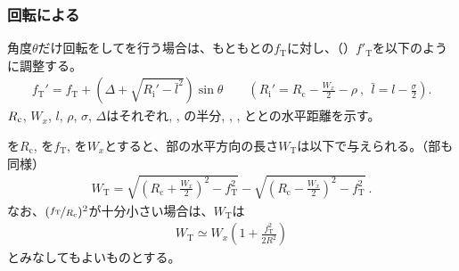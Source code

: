 \subsubsection{\indexTableAlocationAdjustment\nameTable 回転による\nameAlocationAdjustment}
角度$\theta$だけ\TableAlocationAdjustment\nameTable 回転をして\nameAlocationAdjustment を行う場合は、もともとの\TopAlocationLength$f_\mathrm T$に対し、\nameTopAlocationLength（\TopReAlocationLength）$f'_\mathrm T$を以下のように調整する。
\begin{align*}
  f_\mathrm T'
  = f_\mathrm T+\left(\Delta+\sqrt{R_\mathrm i'-\bar l^2}\right)\sin\theta\qquad
    \left(R_\mathrm i' = R_\mathrm c-\frac{W_x}2-\rho~,~~\bar l = l-\frac\sigma2\right).
\end{align*}
$R_\textrm c$, $W_x$, $l$, $\rho$, $\sigma$, $\Delta$はそれぞれ\CenterCurvatureRadius, \ACOD, \JigWidth の半分, \ReceiverPlateRadius, \ReceiverPlateWidth, \ReceiverPlateCenter と\TableCenter との水平距離を示す。



\clearpage
\nameCenterCurvatureRadius を$R_\mathrm c$, \TopAlocationLength を$f_\mathrm T$, \ACOD を$W_x$とすると、\TopEndFace 部の水平方向の長さ$W_\mathrm T$は以下で与えられる。（\BottomEndFace 部も同様）
\begin{align*}
  W_\mathrm T
  = \sqrt{\left(R_\mathrm c+\frac{W_x}2\right)^2-f_\mathrm T^2}
    -\sqrt{\left(R_\mathrm c-\frac{W_x}2\right)^2-f_\mathrm T^2}\ .
\end{align*}
なお、$(\nicefrac{f_\mathrm T}{R_\mathrm c})^2$が十分小さい場合は、$W_\mathrm T$は
\begin{align*}
  W_\mathrm T \simeq W_x\left(1+\frac{f_\mathrm T^2}{2R^2}\right)
\end{align*}
とみなしてもよいものとする。




